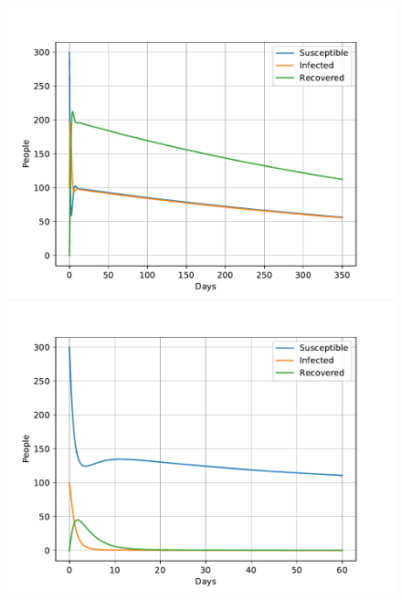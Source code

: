 \documentclass[a4paper]{article}
\begin{document}

\begin{figure}[!htb]
	\centering 
	\includegraphics[scale=0.56]{../plots/opp_c_k3.pdf} %
	\includegraphics[scale=0.56]{../plots/opp_c_k0.pdf}

\end{figure}
\end{document}
